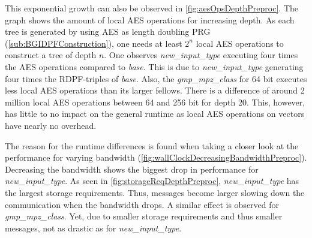 This exponential growth can also be observed in \ref{fig:aesOpsDepthPreproc}.
The graph shows the amount of local AES operations for increasing depth.
As each tree is generated by using AES as length doubling PRG (\ref{sub:BGIDPFConstruction}), one needs at least $2^n$ local AES operations to construct a tree of depth $n$.
One observes \textit{new\_input\_type} executing four times the AES operations compared to \textit{base}.
This is due to \textit{new\_input\_type} generating four times the RDPF-triples of \textit{base}.
Also, the \textit{gmp\_mpz\_class} for 64 bit executes less local AES operations than its larger fellows.
There is a difference of around 2 million local AES operations between 64 and 256 bit for depth 20.
This, however, has little to no impact on the general runtime as local AES operations on  vectors have nearly no overhead.

The reason for the runtime differences is found when taking a closer look at the performance for varying bandwidth (\ref{fig:wallClockDecreasingBandwidthPreproc}).
Decreasing the bandwidth shows the biggest drop in performance for \textit{new\_input\_type}.
As seen in \ref{fig:storageReqDepthPreproc}, \textit{new\_input\_type} has the largest storage requirements.
Thus, messages become larger slowing down the communication when the bandwidth drops.
A similar effect is observed for \textit{gmp\_mpz\_class}.
Yet, due to smaller storage requirements and thus smaller messages, not as drastic as for \textit{new\_input\_type}.

